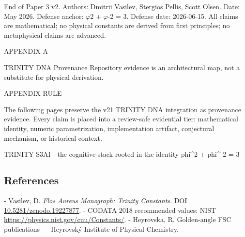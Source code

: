   End of Paper 3 v2. Authors: Dmitrii Vasilev, Stergios Pellis, Scott Olsen. Date: May
  2026. Defense anchor: $\varphi$2 + $\varphi$-2 = 3. Defense date: 2026-06-15. All claims are
  mathematical; no physical constants are derived from first principles; no metaphysical
  claims are advanced.

                                                        APPENDIX A

                      TRINITY DNA Provenance
     Repository evidence is an architectural map, not a substitute for physical derivation.

  APPENDIX RULE

  The following pages preserve the v21 TRINITY DNA integration as provenance evidence. Every claim is
  placed into a review-safe evidential tier: mathematical identity, numeric parametrization, implementation
  artifact, conjectural mechanism, or historical context.

                           TRINITY S3AI - the cognitive stack rooted in the identity phi^2 + phi^-2 = 3

\subsection{References}

- Vasilev, D. \textit{Flos Aureus Monograph: Trinity Constants}. DOI \href{https://zenodo.org/doi/10.5281/zenodo.19227877}{10.5281/zenodo.19227877}.
- CODATA 2018 recommended values: NIST \href{https://physics.nist.gov/cuu/Constants/}{https://physics.nist.gov/cuu/Constants/}.
- Heyrovska, R. Golden-angle FSC publications --- Heyrovský Institute of Physical Chemistry.
